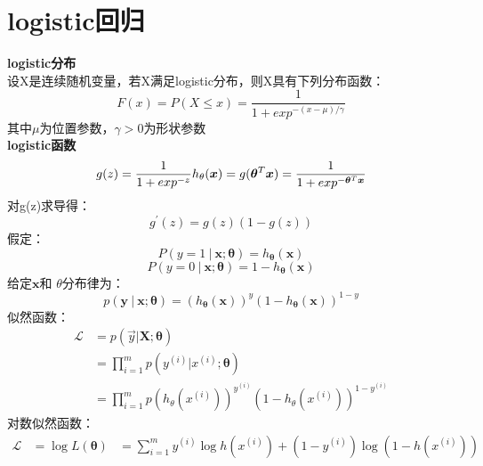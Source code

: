 \documentclass{ctexart}
\begin{document}
    \section{logistic回归}
    \textbf{logistic分布} \\
    设X是连续随机变量，若X满足logistic分布，则X具有下列分布函数： \\
    \begin{equation}\label{logistic_distribution}
      F(x)=P(X\leq x)=\frac{1}{1+exp^{-(x-\mu)/\gamma}}
    \end{equation}
    其中$\mu$为位置参数，$\gamma>0$为形状参数 \\
    \textbf{logistic函数}
    \begin{equation}\label{eq:logistic_function}
      g(z)=\frac{1}{1+exp^{-z}}\\
      h_\theta(\bm x)=g(\bm\theta^T\bm x)=\frac{1}{1+exp^{-\bm\theta^T\bm x}}
    \end{equation}
    对g(z)求导得：\\
    \begin{equation}
      g^{'}(z)=g(z)\left (1-g(z)\right )
    \end{equation}
    假定：\\
    \begin{equation}
      P(y=1\ |\ \bm x;\bm\theta)=h_{\bm\theta} (\bm x)
    \end{equation}
    \begin{equation}
      P(y=0\ |\ \bm x;\bm\theta)=1-h_{\bm\theta} (\bm x)
    \end{equation}
    给定$\bm x $和 $\theta $分布律为：
    \begin{equation}
      p(\bm y\ |\ \bm x;\bm\theta)=\left (h_{\bm\theta} (\bm x)\right )^y\left (1-h_{\bm\theta} (\bm x)\right )^{1-y}
    \end{equation}
    似然函数：\\
    \begin{align}\label{like_log}
      \mathcal L & =p(\vec{y}|\bm X;\bm\theta) \\
       & = \prod_{i=1}^{m}p(y^{(i)}|x^{(i)};\bm\theta) \\
       & = \prod_{i=1}^{m}p\left (h_\theta(x^{(i)})\right )^{y^{(i)}}\left (1-h_\theta(x^{(i)})\right )^{1-y^{(i)}}
    \end{align}
    对数似然函数：\\
    \begin{align}\label{log_log}
      \mathcal L & = \log L(\bm \theta)
       & = \sum_{i=1}^{m}y^{(i)}\log h\left (x^{(i)}\right )+\left (1-y^{(i)}\right )\log\left (1-h(x^{(i)})\right )
    \end{align}
\end{document}
